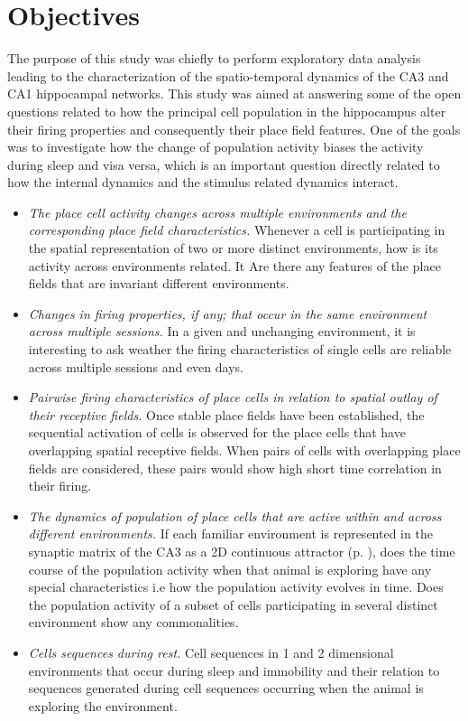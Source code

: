 \section{Objectives}
The purpose of this study was chiefly to perform exploratory data analysis leading to the characterization of the spatio-temporal dynamics of the CA3 and CA1 hippocampal networks. This study was aimed at answering some of the  open questions related to how the principal cell population in the hippocampus alter their firing properties and consequently their place field features. One of the goals was to investigate how the change of population activity biases the activity during sleep and visa versa, which is an important question directly related to how the internal dynamics and the stimulus related dynamics interact. 
\begin{itemize}
\item \emph{The place cell activity changes across multiple environments and the corresponding place field characteristics.}
Whenever a cell is participating in the spatial representation of two or more distinct environments, how is its activity across environments related. It Are there any features of the place fields that are invariant  different environments.
\item \emph{Changes in firing properties, if any; that occur in the same environment across multiple sessions.}
In a given and unchanging environment, it is interesting to ask weather the firing characteristics of single cells are reliable across multiple sessions and even days.
\item \emph{Pairwise firing characteristics of place cells in relation to spatial outlay of their receptive fields.}
Once stable place fields have been established, the sequential activation of cells is observed for the place cells that have overlapping spatial receptive fields. When pairs of cells with overlapping place fields are considered, these pairs would show high short time correlation in their firing.
\item \emph{The dynamics of population of place cells that are active within and across different environments.}
If each familiar environment is represented in the synaptic matrix of the CA3 as a 2D continuous attractor (p. \pageref{fixedpt}), does the time course of the population activity when that animal is exploring have any special characteristics i.e how the population activity evolves in time. Does the population activity of a subset of cells participating in several distinct environment show any commonalities.

\item \emph{Cells sequences during rest.} 
Cell sequences in 1 and 2 dimensional environments that occur during sleep and immobility and their relation to sequences generated during cell sequences occurring when the animal is exploring the environment. 
\end{itemize}
 